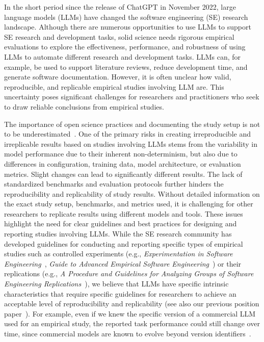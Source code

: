 In the short period since the release of ChatGPT in November 2022, large language models (LLMs) have changed the software engineering (SE) research landscape.
Although there are numerous opportunities to use LLMs to support SE research and development tasks, solid science needs rigorous empirical evaluations to explore the effectiveness, performance, and robustness of using LLMs to automate different research and development tasks.
LLMs can, for example, be used to support literature reviews, reduce development time, and generate software documentation.
However, it is often unclear how valid, reproducible, and replicable empirical studies involving LLM are.
This uncertainty poses significant challenges for researchers and practitioners who seek to draw reliable conclusions from empirical studies.

The importance of open science practices and documenting the study setup is not to be underestimated~\cite{DBLP:journals/corr/abs-2412-17859}.
One of the primary risks in creating irreproducible and irreplicable results based on studies involving LLMs stems from the variability in model performance due to their inherent non-determinism, but also due to differences in configuration, training data, model architecture, or evaluation metrics.
Slight changes can lead to significantly different results.
The lack of standardized benchmarks and evaluation protocols further hinders the reproducibility and replicability of study results.
Without detailed information on the exact study setup, benchmarks, and metrics used, it is challenging for other researchers to replicate results using different models and tools.
These issues highlight the need for clear guidelines and best practices for designing and reporting studies involving LLMs.
While the SE research community has developed guidelines for conducting and reporting specific types of empirical studies such as controlled experiments (e.g., \emph{Experimentation in Software Engineering}~\cite{DBLP:books/sp/WohlinRHORW24}, \emph{Guide to Advanced Empirical Software Engineering}~\cite{DBLP:books/sp/08/SSS2008}) or their replications (e.g., \emph{A Procedure and Guidelines for Analyzing Groups of Software Engineering Replications}~\cite{DBLP:journals/tse/SantosVOJ21}),  we believe that LLMs have specific intrinsic characteristics that require specific guidelines for researchers to achieve an acceptable level of reproducibility and replicability (see also our previous position paper~\cite{DBLP:conf/wsese/0001BFB25}).
For example, even if we knew the specific version of a commercial LLM used for an empirical study, the reported task performance could still change over time, since commercial models are known to evolve beyond version identifiers~\cite{DBLP:journals/corr/abs-2307-09009}.

